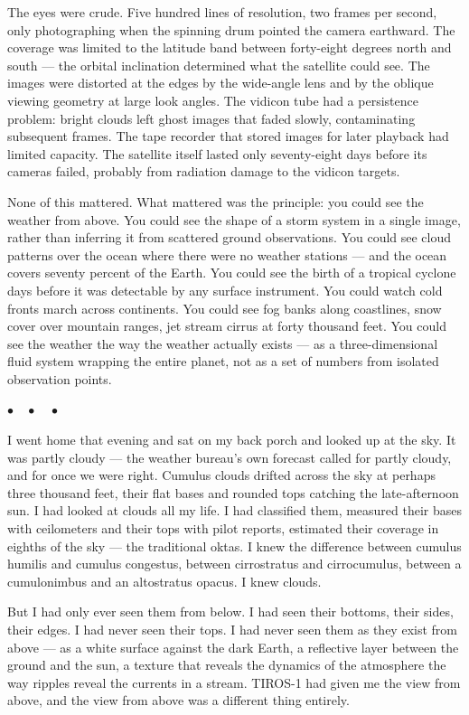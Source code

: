 \documentclass[12pt, letterpaper]{article}
\begin{document}
The eyes were crude. Five hundred lines of resolution, two frames per second, only photographing when the spinning drum pointed the camera earthward. The coverage was limited to the latitude band between forty-eight degrees north and south --- the orbital inclination determined what the satellite could see. The images were distorted at the edges by the wide-angle lens and by the oblique viewing geometry at large look angles. The vidicon tube had a persistence problem: bright clouds left ghost images that faded slowly, contaminating subsequent frames. The tape recorder that stored images for later playback had limited capacity. The satellite itself lasted only seventy-eight days before its cameras failed, probably from radiation damage to the vidicon targets.

None of this mattered. What mattered was the principle: you could see the weather from above. You could see the shape of a storm system in a single image, rather than inferring it from scattered ground observations. You could see cloud patterns over the ocean where there were no weather stations --- and the ocean covers seventy percent of the Earth. You could see the birth of a tropical cyclone days before it was detectable by any surface instrument. You could watch cold fronts march across continents. You could see fog banks along coastlines, snow cover over mountain ranges, jet stream cirrus at forty thousand feet. You could see the weather the way the weather actually exists --- as a three-dimensional fluid system wrapping the entire planet, not as a set of numbers from isolated observation points.

\begin{center}
$\bullet\quad\bullet\quad\bullet$
\end{center}

I went home that evening and sat on my back porch and looked up at the sky. It was partly cloudy --- the weather bureau's own forecast called for partly cloudy, and for once we were right. Cumulus clouds drifted across the sky at perhaps three thousand feet, their flat bases and rounded tops catching the late-afternoon sun. I had looked at clouds all my life. I had classified them, measured their bases with ceilometers and their tops with pilot reports, estimated their coverage in eighths of the sky --- the traditional oktas. I knew the difference between cumulus humilis and cumulus congestus, between cirrostratus and cirrocumulus, between a cumulonimbus and an altostratus opacus. I knew clouds.

But I had only ever seen them from below. I had seen their bottoms, their sides, their edges. I had never seen their tops. I had never seen them as they exist from above --- as a white surface against the dark Earth, a reflective layer between the ground and the sun, a texture that reveals the dynamics of the atmosphere the way ripples reveal the currents in a stream. TIROS-1 had given me the view from above, and the view from above was a different thing entirely.
\end{document}
